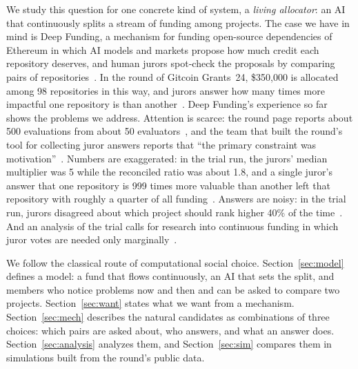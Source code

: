 \documentclass[doubleblind]{ecai}
\theoremstyle{remark}
\begin{document}
We study this question for one concrete kind of system, a \emph{living allocator}: an AI that continuously splits a stream of funding among projects. The case we have in mind is Deep Funding, a mechanism for funding open-source dependencies of Ethereum in which AI models and markets propose how much credit each repository deserves, and human jurors spot-check the proposals by comparing pairs of repositories~\cite{buterin2025steering,gg24round}. In the round of Gitcoin Grants~24, \$350{,}000 is allocated among 98 repositories in this way, and jurors answer how many times more impactful one repository is than another~\cite{gg24round}. Deep Funding's experience so far shows the problems we address. Attention is scarce: the round page reports about 500 evaluations from about 50 evaluators~\cite{gg24round}, and the team that built the round's tool for collecting juror answers reports that ``the primary constraint was motivation''~\cite{niemerg2026verdict}. Numbers are exaggerated: in the trial run, the jurors' median multiplier was 5 while the reconciled ratio was about 1.8, and a single juror's answer that one repository is 999 times more valuable than another left that repository with roughly a quarter of all funding~\cite{niemerg2026verdict}. Answers are noisy: in the trial run, jurors disagreed about which project should rank higher 40\% of the time~\cite{niemerg2026verdict}. And an analysis of the trial calls for research into continuous funding in which juror votes are needed only marginally~\cite{kronovet2025jury}.

We follow the classical route of computational social choice. Section~\ref{sec:model} defines a model: a fund that flows continuously, an AI that sets the split, and members who notice problems now and then and can be asked to compare two projects. Section~\ref{sec:want} states what we want from a mechanism. Section~\ref{sec:mech} describes the natural candidates as combinations of three choices: which pairs are asked about, who answers, and what an answer does. Section~\ref{sec:analysis} analyzes them, and Section~\ref{sec:sim} compares them in simulations built from the round's public data.
\end{document}
